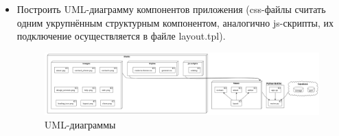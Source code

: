 \documentclass[14pt]{extarticle}
\begin{document}
\begin{itemize}
\item Построить UML-диаграмму компонентов приложения (css-файлы считать одним укрупнённым структурным компонентом, аналогично js-скрипты, их подключение осуществляется в файле layout.tpl).

\begin{figure}[H]
\centering
\includegraphics[width=.9\linewidth]{images/2023-04-05_10-35-52_screenshot.png}
\caption{UML-диаграммы}
\end{figure}
\end{itemize}
\end{document}
